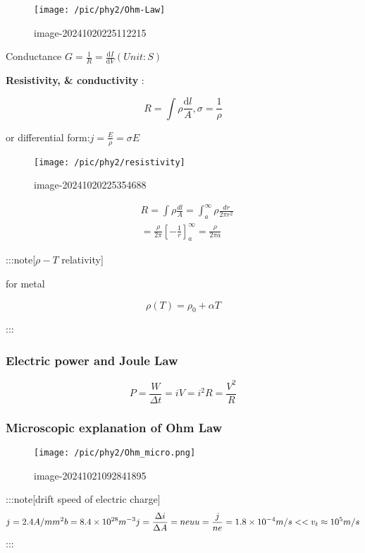 \documentclass[
]{article}
\begin{document}
\begin{figure}
\centering
\texttt{[image: /pic/phy2/Ohm-Law]}
\caption{image-20241020225112215}
\end{figure}

Conductance \(G=\frac{1}{R}=\frac{\mathrm d I}{\mathrm d V}(Unit:S)\)

\textbf{Resistivity, \& conductivity} :

\[
R=\int \rho \frac{\mathrm d l}{A}, \sigma =\frac{1}{\rho}
\]

or differential form:\(j=\frac{E}{\rho}=\sigma E\)

\begin{figure}
\centering
\texttt{[image: /pic/phy2/resistivity]}
\caption{image-20241020225354688}
\end{figure}

\[
\begin{aligned}
&R=\int\rho\frac{dl}{A}=\int_a^\infty\rho\frac{dr}{2\pi r^2} \\
&=\frac{\rho}{2\pi}[-\frac{1}{r}]_a^\infty=\frac{\rho}{2\pi a}
\end{aligned}
\]

:::note{[}\(\rho-T\) relativity{]}

for metal

\[
\rho(T)=\rho_0+\alpha T
\]

:::

\hypertarget{electric-power-and-joule-law}{%
\subsubsection{Electric power and Joule
Law}\label{electric-power-and-joule-law}}

\[
P=\frac W{\Delta t}=iV=i^2R=\frac{V^2}R
\]

\hypertarget{microscopic-explanation-of-ohm-law}{%
\subsubsection{Microscopic explanation of Ohm
Law}\label{microscopic-explanation-of-ohm-law}}

\begin{figure}
\centering
\texttt{[image: /pic/phy2/Ohm\_micro.png]}
\caption{image-20241021092841895}
\end{figure}

:::note{[}drift speed of electric charge{]} \[
j=2.4A/mm^2\\
b=8.4\times 10^{28}m^{-3}\\
j=\frac{\Delta i}{\Delta A}=neu\\
u=\frac{j}{ne}=1.8\times 10^{-4}m/s<<v_t\approx 10^5m/s
\] :::
\end{document}
